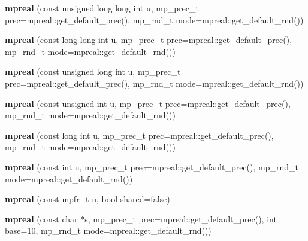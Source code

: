 \begin{DoxyCompactItemize}
{\bfseries mpreal} (const unsigned long long int u, mp\+\_\+prec\+\_\+t prec=mpreal\+::get\+\_\+default\+\_\+prec(), mp\+\_\+rnd\+\_\+t mode=mpreal\+::get\+\_\+default\+\_\+rnd())
\item 
\mbox{\label{classmpfr_1_1mpreal_afd97c92d01079a2fcc5965ae8c924c98}} 
{\bfseries mpreal} (const long long int u, mp\+\_\+prec\+\_\+t prec=mpreal\+::get\+\_\+default\+\_\+prec(), mp\+\_\+rnd\+\_\+t mode=mpreal\+::get\+\_\+default\+\_\+rnd())
\item 
\mbox{\label{classmpfr_1_1mpreal_afe90ffeaa0b8deb8e96aa6df1e55b23d}} 
{\bfseries mpreal} (const unsigned long int u, mp\+\_\+prec\+\_\+t prec=mpreal\+::get\+\_\+default\+\_\+prec(), mp\+\_\+rnd\+\_\+t mode=mpreal\+::get\+\_\+default\+\_\+rnd())
\item 
\mbox{\label{classmpfr_1_1mpreal_a0cb61a8a4e5266db74df1ca5f64c1743}} 
{\bfseries mpreal} (const unsigned int u, mp\+\_\+prec\+\_\+t prec=mpreal\+::get\+\_\+default\+\_\+prec(), mp\+\_\+rnd\+\_\+t mode=mpreal\+::get\+\_\+default\+\_\+rnd())
\item 
\mbox{\label{classmpfr_1_1mpreal_ab3444b6afda61cd871dd426eb078ec19}} 
{\bfseries mpreal} (const long int u, mp\+\_\+prec\+\_\+t prec=mpreal\+::get\+\_\+default\+\_\+prec(), mp\+\_\+rnd\+\_\+t mode=mpreal\+::get\+\_\+default\+\_\+rnd())
\item 
\mbox{\label{classmpfr_1_1mpreal_a57a936769bf2657134b73f041b771e6e}} 
{\bfseries mpreal} (const int u, mp\+\_\+prec\+\_\+t prec=mpreal\+::get\+\_\+default\+\_\+prec(), mp\+\_\+rnd\+\_\+t mode=mpreal\+::get\+\_\+default\+\_\+rnd())
\item 
\mbox{\label{classmpfr_1_1mpreal_afe16d889eded45f1fec612bb9671cc06}} 
{\bfseries mpreal} (const mpfr\+\_\+t u, bool shared=false)
\item 
\mbox{\label{classmpfr_1_1mpreal_ad296a1c6af9b15eda9c177a22b38af09}} 
{\bfseries mpreal} (const char $\ast$s, mp\+\_\+prec\+\_\+t prec=mpreal\+::get\+\_\+default\+\_\+prec(), int base=10, mp\+\_\+rnd\+\_\+t mode=mpreal\+::get\+\_\+default\+\_\+rnd())
\item 
\mbox{\label{classmpfr_1_1mpreal_aec2c38d5275fac999ef1dbbecbd4cf4b}} 

\end{DoxyCompactItemize}
